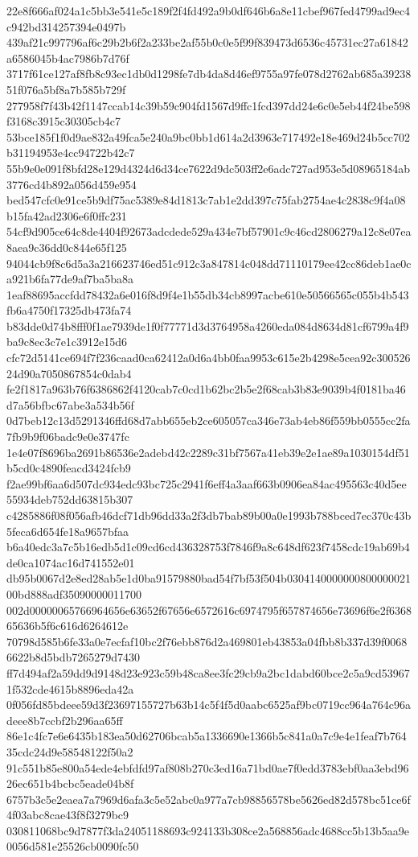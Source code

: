 {22e8f666af024a1c5bb3e541e5c189f2f4fd492a9b0df646b6a8e11cbef967fed4799ad9ec4c942bd314257394e0497b
439af21c997796af6c29b2b6f2a233be2af55b0c0e5f99f839473d6536c45731ec27a61842a6586045b4ac7986b7d76f
3717f61ce127af8fb8c93ec1db0d1298fe7db4da8d46ef9755a97fe078d2762ab685a3923851f076a5bf8a7b585b729f
277958f7f43b42f1147ccab14c39b59c904fd1567d9ffc1fcd397dd24e6c0e5eb44f24be598f3168c3915c30305cb4c7
53bce185f1f0d9ae832a49fca5e240a9bc0bb1d614a2d3963e717492e18e469d24b5cc702b31194953e4cc94722b42c7
55b9e0e091f8bfd28e129d4324d6d34ce7622d9dc503ff2e6adc727ad953e5d08965184ab3776cd4b892a056d459e954
bed547cfc0e91ce5b9df75ac5389e84d1813c7ab1e2dd397c75fab2754ae4c2838c9f4a08b15fa42ad2306e6f0ffc231
54cf9d905ce64c8de4404f92673adcdede529a434e7bf57901c9c46cd2806279a12c8e07ea8aea9c36dd0c844e65f125
94044cb9f8c6d5a3a216623746ed51c912c3a847814c048dd71110179ee42cc86deb1ae0ca921b6fa77de9af7ba5ba8a
1eaf88695accfdd78432a6e016f8d9f4e1b55db34cb8997acbe610e50566565c055b4b543fb6a4750f17325db473fa74
b83dde0d74b8fff0f1ae7939de1f0f77771d3d3764958a4260eda084d8634d81cf6799a4f9ba9c8ec3c7e1c3912e15d6
cfc72d5141ce694f7f236caad0ca62412a0d6a4bb0faa9953c615e2b4298e5cea92c30052624d90a7050867854c0dab4
fe2f1817a963b76f6386862f4120cab7c0cd1b62bc2b5e2f68cab3b83e9039b4f0181ba46d7a56bfbc67abe3a534b56f
0d7beb12c13d5291346ffd68d7abb655eb2ce605057ca346e73ab4eb86f559bb0555cc2fa7fb9b9f06badc9e0e3747fc
1e4e07f8696ba2691b86536e2adebd42c2289c31bf7567a41eb39e2e1ae89a1030154df51b5cd0c4890feacd3424fcb9
f2ae99bf6aa6d507dc934edc93bc725c2941f6eff4a3aaf663b0906ea84ac495563c40d5ee55934deb752dd63815b307
c4285886f08f056afb46dcf71db96dd33a2f3db7bab89b00a0e1993b788bced7ec370c43b5feca6d654fe18a9657bfaa
b6a40edc3a7c5b16edb5d1c09cd6cd436328753f7846f9a8c648df623f7458cdc19ab69b4de0ca1074ac16d741552e01
db95b0067d2e8ed28ab5e1d0ba91579880bad54f7bf53f504b030414000000080000002100bd888adf35090000011700
002d00000065766964656e63652f67656e6572616c6974795f657874656e73696f6e2f636865636b5f6c616d6264612e
70798d585b6fe33a0e7ecfaf10bc2f76ebb876d2a469801eb43853a04fbb8b337d39f00686622b8d5bdb7265279d7430
ff7d494af2a59dd9d9148d23e923c59b48ca8ee3fc29cb9a2bc1dabd60bce2c5a9cd539671f532cde4615b8896eda42a
0f056fd85bdeee59d3f23697155727b63b14c5f4f5d0aabc6525af9bc0719cc964a764c96adeee8b7ccbf2b296aa65ff
86e1c4fc7e6e6435b183ea50d62706bcab5a1336690e1366b5c841a0a7c9e4e1feaf7b76435cdc24d9e58548122f50a2
91c551b85e800a54ede4ebfdfd97af808b270c3ed16a71bd0ae7f0edd3783ebf0aa3ebd9626ec651b4bcbc5eade04b8f
6757b3c5e2eaea7a7969d6afa3c5e52abc0a977a7cb98856578be5626ed82d578bc51ce6f4f03abc8cae43f8f3279bc9
030811068bc9d7877f3da24051188693c924133b308ce2a568856adc4688cc5b13b5aa9e0056d581e25526cb0090fc50
}
